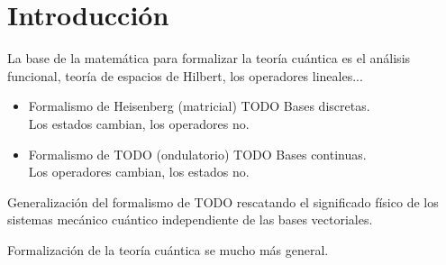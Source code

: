 \section{Introducción}

 La base de la matemática para formalizar la teoría cuántica es el análisis funcional, teoría de espacios de Hilbert, los operadores lineales...

 \begin{itemize}
     \item Formalismo de Heisenberg (matricial) TODO Bases discretas.\\
           Los estados cambian, los operadores no.
     \item Formalismo de TODO (ondulatorio) TODO Bases continuas.\\
           Los operadores cambian, los estados no.
 \end{itemize}

 Generalización del formalismo de TODO rescatando el significado físico de los sistemas mecánico cuántico independiente de las bases vectoriales.

 Formalización de la teoría cuántica se mucho más general.

